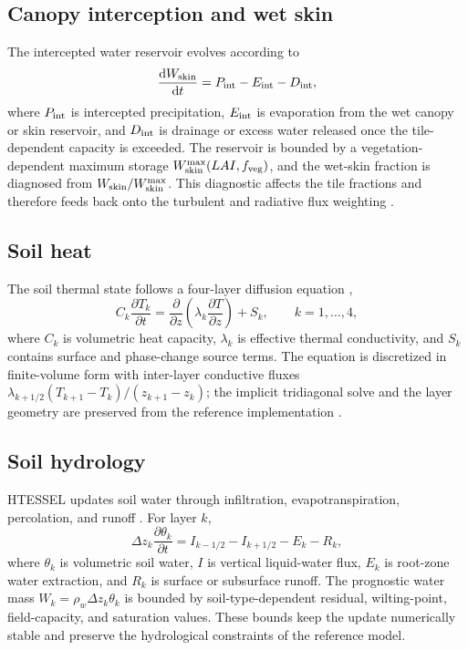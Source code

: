 \subsection{Canopy interception and wet skin}

The intercepted water reservoir evolves according to
\begin{equation}
  \frac{{\rm d}W_{\rm skin}}{{\rm d}t}
  = P_{\rm int} - E_{\rm int} - D_{\rm int},
\label{eq:model-wskin}
\end{equation}
where $P_{\rm int}$ is intercepted precipitation, $E_{\rm int}$ is evaporation
from the wet canopy or skin reservoir, and $D_{\rm int}$ is drainage or excess
water released once the tile-dependent capacity is exceeded.  The reservoir is
bounded by a vegetation-dependent maximum storage $W_{\rm skin}^{\max}(LAI,
f_{\rm veg})$,
and the wet-skin fraction is diagnosed from $W_{\rm skin}/W_{\rm
skin}^{\max}$.  This diagnostic affects the tile fractions and therefore feeds
back onto the turbulent and radiative flux weighting
\citep{ViterboBeljaars1995,VanDenHurk2000}.

\subsection{Soil heat}

The soil thermal state follows a four-layer diffusion equation
\citep{ViterboBeljaars1995,ECMWFIFSPartIV},
\begin{equation}
  C_k \frac{\partial T_k}{\partial t}
  =
  \frac{\partial}{\partial z}
  \left(\lambda_k \frac{\partial T}{\partial z}\right) + S_k,
  \qquad k=1,\ldots,4 ,
\label{eq:model-soilheat}
\end{equation}
where $C_k$ is volumetric heat capacity, $\lambda_k$ is effective thermal
conductivity, and $S_k$ contains surface and phase-change source terms.  The
equation is discretized in finite-volume form with inter-layer conductive
fluxes $\lambda_{k+1/2}(T_{k+1}-T_k)/(z_{k+1}-z_k)$; the implicit tridiagonal
solve and the layer geometry are preserved from the reference implementation
\citep{ViterboBeljaars1995,ECMWFIFSPartIV}.

\subsection{Soil hydrology}

HTESSEL updates soil water through infiltration, evapotranspiration,
percolation, and runoff \citep{Balsamo2009}.  For layer $k$,
\begin{equation}
  \Delta z_k \frac{\partial \theta_k}{\partial t}
  =
  I_{k-1/2} - I_{k+1/2} - E_k - R_k ,
\label{eq:model-hydro}
\end{equation}
where $\theta_k$ is volumetric soil water, $I$ is vertical liquid-water flux,
$E_k$ is root-zone water extraction, and $R_k$ is surface or subsurface runoff.
The prognostic water mass $W_k = \rho_w \Delta z_k \theta_k$
is bounded by soil-type-dependent residual, wilting-point, field-capacity,
and saturation values.  These bounds keep the update numerically stable and
preserve the hydrological constraints of the reference model.

